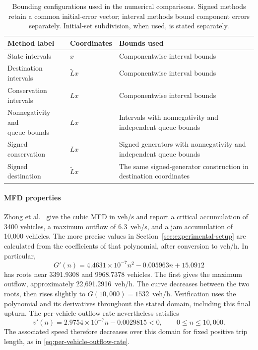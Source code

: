 \documentclass[final]{cas-sc}
\theoremstyle{definition}
\theoremstyle{plain}
\theoremstyle{definition}
\theoremstyle{plain}
\begin{document}
\begin{table}[pos=!htb]
\centering\small
\caption{Bounding configurations used in the numerical comparisons.
Signed methods retain a common initial-error vector; interval methods
bound component errors separately. Initial-set subdivision, when used,
is stated separately.}
\label{tab:verification-methods}
\begin{tabularx}{\linewidth}{@{}l l X@{}}
\toprule
Method label & Coordinates & Bounds used\\
\midrule
State intervals & $x$ & Componentwise interval bounds\\
Destination intervals & $\widetilde Lx$ & Componentwise interval bounds\\
Conservation intervals & $Lx$ & Componentwise interval bounds\\
\shortstack[l]{Nonnegativity and\\queue bounds} & $Lx$ & Intervals with nonnegativity and independent queue bounds\\
Signed conservation & $Lx$ & Signed generators with nonnegativity and independent queue bounds\\
Signed destination & $\widetilde Lx$ & The same signed-generator construction in destination coordinates\\
\bottomrule
\end{tabularx}
\end{table}

\paragraph{MFD properties}
\label{app:mfd-properties}
Zhong et al.~\cite{zhong2018robust} give the cubic MFD in veh/s and
report a critical accumulation of 3400 vehicles, a maximum outflow of
6.3~veh/s, and a jam accumulation of 10,000 vehicles. The more precise
values in Section~\ref{sec:experimental-setup} are calculated from the
coefficients of that polynomial, after conversion to veh/h. In
particular,
\[
G'(n)=4.4631\times10^{-7}n^2-0.005963n+15.0912
\]
has roots near 3391.9308 and 9968.7378 vehicles. The first gives the
maximum outflow, approximately 22,691.2916~veh/h. The curve decreases
between the two roots, then rises slightly to
$G(10{,}000)=1532$~veh/h. Verification uses the polynomial and its
derivatives throughout the stated domain, including this final upturn.
The per-vehicle outflow rate nevertheless satisfies
\[
v'(n)=2.9754\times10^{-7}n-0.0029815<0,
\qquad 0\le n\le10{,}000.
\]
The associated speed therefore decreases over this domain for fixed
positive trip length, as in \eqref{eq:per-vehicle-outflow-rate}.
\end{document}
